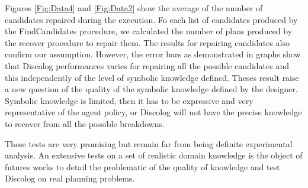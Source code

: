 \documentclass[conference]{IEEEtran}
\begin{document}
	\par  Figures \ref{Fig:Data4} and \ref{Fig:Data2} show the average of the number of candidates repaired during the execution. Fo each list of candidates produced by the FindCandidates procedure, we calculated the number of plans produced by the recover procedure to repair them. The results for repairing  candidates also confirm our assumption. However, the error bars as demonstrated in graphs show that Discolog performances varies for repairing all the possible candidates and this independently of the level of symbolic knowledge defined. Theses result raise a new question of the quality of the symbolic knowledge defined by the designer. Symbolic knowledge is limited, then it has to be expressive and very representative of the agent policy, or Discolog will not have the precise knowledge to recover from all the possible breakdowns. 
	\par These tests are very promising but remain far from being definite experimental analysis. An extensive tests on a set of realistic domain knowledge is the object of futures works to detail the problematic of the quality of knowledge and test Discolog on real planning problems. 
\end{document}
